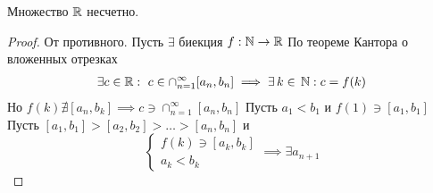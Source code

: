 \begin{proposition}
    Множество $ \mathbb{R} $ несчетно.
\end{proposition} \begin{proof}
    От противного. Пусть $ \exists  $ биекция $ f: \mathbb{N} \to \mathbb{R} $
    По теореме Кантора о вложенных отрезках \begin{gather}
        \exists c \in \mathbb{R}: \ c \in \cap_{n = 1}^ \infty[a_n, b_n] \implies \exists\, k \in\, \mathbb{N}: c = f(k)
    \end{gather}
    Но $ f(k) \nexists [a_n, b_k] \implies c \ni \cap_{n  = 1}^ \infty [a_n, b_n] $
    Пусть $ a_1 < b_1 $ и $ f(1) \ni [a_1, b_1] $
    Пусть $ [a_1, b_1] > [a_2, b_2] > \dots > [a_n, b_n] $ и \[\begin{cases}
        f(k) \ni [a_k, b_k] \\
        a_k < b_k
    \end{cases} \implies \exists a_{n + 1} \]
\end{proof}
